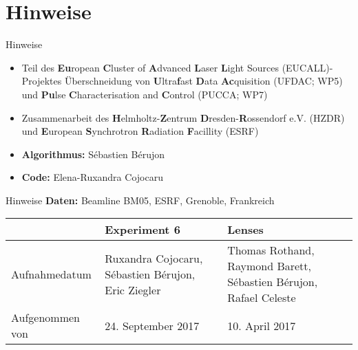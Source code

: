 \section{Hinweise}

\begin{frame}{Hinweise}
	\begin{itemize}
		\item<2-> Teil des \textbf{Eu}ropean \textbf{C}luster of \textbf{A}dvanced \textbf{L}aser \textbf{L}ight Sources (EUCALL)-Projektes
		\rightarrow Überschneidung von \textbf{U}ltra\textbf{f}ast \textbf{D}ata \textbf{Ac}quisition (UFDAC; WP5) und \textbf{Pu}lse \textbf{C}haracterisation and \textbf{C}ontrol (PUCCA; WP7)
		\item<3-> Zusammenarbeit des \textbf{H}elmholtz-\textbf{Z}entrum \textbf{D}resden-\textbf{R}ossendorf e.V. (HZDR) und \textbf{E}uropean \textbf{S}ynchrotron \textbf{R}adiation \textbf{F}acillity (ESRF)
		\item<4-> \textbf{Algorithmus:} Sébastien Bérujon
		\item<5-> \textbf{Code:} Elena-Ruxandra Cojocaru
	\end{itemize}
\end{frame}

\begin{frame}{Hinweise}
	\textbf{Daten:} Beamline BM05, ESRF, Grenoble, Frankreich
	\begin{tabularx}{\textwidth}{@{} XXX @{}}
		\toprule
		& \textbf{Experiment 6} & \textbf{Lenses} \\
		\hline
		Aufnahmedatum & Ruxandra Cojocaru, Sébastien Bérujon, Eric Ziegler & Thomas Rothand, Raymond Barett, Sébastien Bérujon, Rafael Celeste \\
		Aufgenommen von & 24. September 2017 & 10. April 2017 \\
		\bottomrule
	\end{tabularx}
\end{frame}